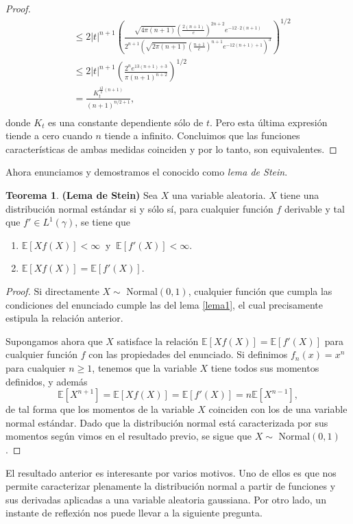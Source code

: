 \documentclass[letterpaper,twoside,12pt]{book}
\newcommand{\E}{\mathbb{E}}
\newcommand{\1}{\mathds{1}}
\theoremstyle{definition}
\theoremstyle{definition}
\newtheorem{teo}{Teorema}
\theoremstyle{remark}
\theoremstyle{definition}
\theoremstyle{definition}
\theoremstyle{definition}
\theoremstyle{definition}
\theoremstyle{definition}
\begin{document}
\begin{proof}
\begin{align*}
      &\leq 2|t|^{n+1}\left(\frac{\sqrt{4\pi(n+1)}\left(\tfrac{2(n+1)}{e}\right)^{2n+2}e^{-12\cdot 2(n+1)}}{2^{n+1}\left(\sqrt{2\pi(n+1)}\left(\tfrac{n+1}{e}\right)^{n+1}e^{-12(n+1)+1}\right)^{3}}\right)^{1/2}\\
      &\leq 2|t|^{n+1}\left(\frac{2^ne^{13(n+1)+3}}{\pi(n+1)^{n+2}}\right)^{1/2}\\
      &=\frac{K_t^{\tfrac{13}{2}(n+1)}}{(n+1)^{n/2+1}},\\
   \end{align*} 
   donde $K_t$ es una constante dependiente sólo de $t$. Pero esta última expresión tiende a cero cuando $n$ tiende a infinito. Concluimos que las funciones características de ambas medidas coinciden y por lo tanto, son equivalentes.
  \end{proof}

Ahora enunciamos y demostramos el conocido como \textit{lema de Stein}.
\begin{teo}\textbf{(Lema de Stein)} \label{LemaStein} Sea $X$ una variable aleatoria. $X$ tiene una distribución normal estándar si y sólo sí, para cualquier función $f$ derivable y tal que $f'\in L^{1}(\gamma)$, se tiene que
   \begin{enumerate}
       \item $\E\left[Xf(X)\right]<\infty \ $ y $ \ \E\left[f'(X)\right]<\infty$.
       \item $\E\left[Xf(X)\right]=\E\left[f'(X)\right]$.
   \end{enumerate}
\end{teo}
\begin{proof} 
  Si directamente $X\sim$ Normal$(0,1)$, cualquier función que cumpla las condiciones del enunciado cumple las del lema \ref{lema1}, el cual precisamente estipula la relación anterior. 

  Supongamos ahora que $X$ satisface la relación $\E\left[Xf(X)\right]=\E\left[f'(X)\right]$ para cualquier función $f$ con las propiedades del enunciado. Si definimos $f_n(x)=x^n$ para cualquier $n\geq1$, tenemos que la variable $X$ tiene todos sus momentos definidos, y además 
  \[
   \E\left[X^{n+1}\right]=\E\left[Xf(X)\right]=\E\left[f'(X)\right]=n\E\left[X^{n-1}\right],
  \] 
  de tal forma que los momentos de la variable $X$ coinciden con los de una variable normal estándar. Dado que la distribución normal está caracterizada por sus momentos según vimos en el resultado previo, se sigue que $X\sim$ Normal$(0,1)$.
 \end{proof}
El resultado anterior es interesante por varios motivos. Uno de ellos es que nos permite caracterizar plenamente la distribución normal a partir de funciones y sus derivadas aplicadas a una variable aleatoria gaussiana. Por otro lado, un instante de reflexión nos puede llevar a la siguiente pregunta.
\end{document}
